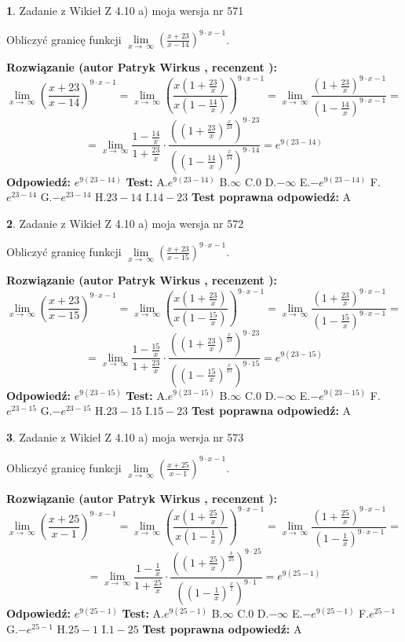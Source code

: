 \documentclass[12pt, a4paper]{article}
\theoremstyle{definition} %
\newtheorem{zad}{}
\newcommand{\zadStart}[1]{\begin{zad}#1\newline}
\newcommand{\zadStop}{\end{zad}}
\newcommand{\rozwStart}[2]{\noindent \textbf{Rozwiązanie (autor #1 , recenzent #2): }\newline}
\newcommand{\rozwStop}{\newline}
\newcommand{\odpStart}{\noindent \textbf{Odpowiedź:}\newline}
\newcommand{\odpStop}{\newline}
\newcommand{\testStart}{\noindent \textbf{Test:}\newline}
\newcommand{\testStop}{\newline}
\newcommand{\kluczStart}{\noindent \textbf{Test poprawna odpowiedź:}\newline}
\newcommand{\kluczStop}{\newline}
\begin{document}
\zadStart{Zadanie z Wikieł Z 4.10 a) moja wersja nr 571}


Obliczyć granicę funkcji  $\lim\limits_{x\to\ \infty}(\frac{x+23}{x-14})^{9\cdot x-1}$.
\zadStop
\rozwStart{Patryk Wirkus}{}
$$\lim\limits_{x\to\ \infty}(\frac{x+23}{x-14})^{9\cdot x-1} = \lim\limits_{x\to\ \infty}(\frac{x(1+\frac{23}{x})}{x(1-\frac{14}{x})})^{9\cdot x-1}=\lim\limits_{x\to\ \infty}\frac{(1+\frac{23}{x})^{9\cdot x-1}}{(1-\frac{14}{x})^{9\cdot x-1}}=$$
$$=\lim\limits_{x\to\ \infty}\frac{1-\frac{14}{x}}{1+\frac{23}{x}}\cdot\frac{((1+\frac{23}{x})^{\frac{x}{23}})^{9\cdot23}}{((1-\frac{14}{x})^{\frac{x}{14}})^{9\cdot14}}=e^{9(23-14)}$$
\rozwStop
\odpStart
$e^{9(23-14)}$
\odpStop
\testStart
A.$e^{9(23-14)}$ B.$\infty$ C.$0$ D.$-\infty$ E.$-e^{9(23-14)}$
F.$e^{23-14}$ G.$-e^{23-14}$
H.$23-14$
I.$14-23$
\testStop
\kluczStart
A
\kluczStop



\zadStart{Zadanie z Wikieł Z 4.10 a) moja wersja nr 572}


Obliczyć granicę funkcji  $\lim\limits_{x\to\ \infty}(\frac{x+23}{x-15})^{9\cdot x-1}$.
\zadStop
\rozwStart{Patryk Wirkus}{}
$$\lim\limits_{x\to\ \infty}(\frac{x+23}{x-15})^{9\cdot x-1} = \lim\limits_{x\to\ \infty}(\frac{x(1+\frac{23}{x})}{x(1-\frac{15}{x})})^{9\cdot x-1}=\lim\limits_{x\to\ \infty}\frac{(1+\frac{23}{x})^{9\cdot x-1}}{(1-\frac{15}{x})^{9\cdot x-1}}=$$
$$=\lim\limits_{x\to\ \infty}\frac{1-\frac{15}{x}}{1+\frac{23}{x}}\cdot\frac{((1+\frac{23}{x})^{\frac{x}{23}})^{9\cdot23}}{((1-\frac{15}{x})^{\frac{x}{15}})^{9\cdot15}}=e^{9(23-15)}$$
\rozwStop
\odpStart
$e^{9(23-15)}$
\odpStop
\testStart
A.$e^{9(23-15)}$ B.$\infty$ C.$0$ D.$-\infty$ E.$-e^{9(23-15)}$
F.$e^{23-15}$ G.$-e^{23-15}$
H.$23-15$
I.$15-23$
\testStop
\kluczStart
A
\kluczStop



\zadStart{Zadanie z Wikieł Z 4.10 a) moja wersja nr 573}


Obliczyć granicę funkcji  $\lim\limits_{x\to\ \infty}(\frac{x+25}{x-1})^{9\cdot x-1}$.
\zadStop
\rozwStart{Patryk Wirkus}{}
$$\lim\limits_{x\to\ \infty}(\frac{x+25}{x-1})^{9\cdot x-1} = \lim\limits_{x\to\ \infty}(\frac{x(1+\frac{25}{x})}{x(1-\frac{1}{x})})^{9\cdot x-1}=\lim\limits_{x\to\ \infty}\frac{(1+\frac{25}{x})^{9\cdot x-1}}{(1-\frac{1}{x})^{9\cdot x-1}}=$$
$$=\lim\limits_{x\to\ \infty}\frac{1-\frac{1}{x}}{1+\frac{25}{x}}\cdot\frac{((1+\frac{25}{x})^{\frac{x}{25}})^{9\cdot25}}{((1-\frac{1}{x})^{\frac{x}{1}})^{9\cdot1}}=e^{9(25-1)}$$
\rozwStop
\odpStart
$e^{9(25-1)}$
\odpStop
\testStart
A.$e^{9(25-1)}$ B.$\infty$ C.$0$ D.$-\infty$ E.$-e^{9(25-1)}$
F.$e^{25-1}$ G.$-e^{25-1}$
H.$25-1$
I.$1-25$
\testStop
\kluczStart
A
\kluczStop
\end{document}
